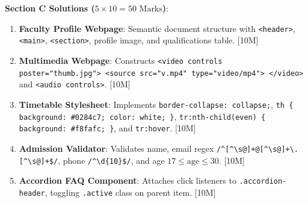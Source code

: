 \begin{solutionbox}
\medskip
\noindent\textbf{Section C Solutions ($5 \times 10 = 50\text{ Marks}$)}:
\begin{enumerate}[start=17]
    \item \textbf{Faculty Profile Webpage}: Semantic document structure with \texttt{<header>}, \texttt{<main>}, \texttt{<section>}, profile image, and qualifications table. [10M]
    \item \textbf{Multimedia Webpage}: Constructs \texttt{<video controls poster="thumb.jpg"> <source src="v.mp4" type="video/mp4"> </video>} and \texttt{<audio controls>}. [10M]
    \item \textbf{Timetable Stylesheet}: Implements \texttt{border-collapse: collapse;}, \texttt{th \{ background: \#0284c7; color: white; \}}, \texttt{tr:nth-child(even) \{ background: \#f8fafc; \}}, and \texttt{tr:hover}. [10M]
    \item \textbf{Admission Validator}: Validates name, email regex \texttt{/\textasciicircum[\textasciicircum\textbackslash s@]+@[\textasciicircum\textbackslash s@]+\textbackslash.[\textasciicircum\textbackslash s@]+\$/}, phone \texttt{/\textasciicircum\textbackslash d\{10\}\$/}, and age $17 \le \text{age} \le 30$. [10M]
    \item \textbf{Accordion FAQ Component}: Attaches click listeners to \texttt{.accordion-header}, toggling \texttt{.active} class on parent item. [10M]
\end{enumerate}
\end{solutionbox}
